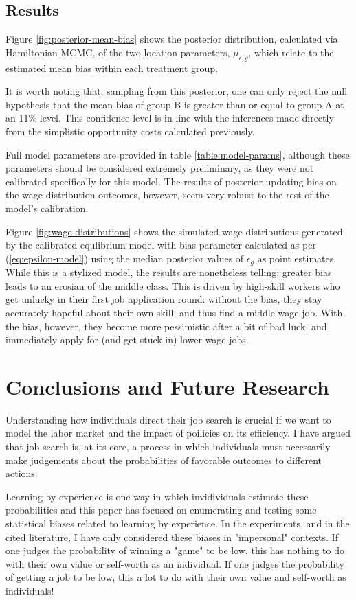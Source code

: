 \documentclass[a4paper,12pt]{article}
\begin{document}
\subsection{ Results }

Figure \ref{fig:posterior-mean-bias} shows the posterior distribution, calculated via Hamiltonian MCMC, of the two location parameters, $\mu_{\epsilon, g}$, which relate to the estimated mean bias within each treatment group.

It is worth noting that, sampling from this posterior, one can only reject the null hypothesis that the mean bias of group B is greater than or equal to group A at an 11\% level. This confidence level is in line with the inferences made directly from the simplistic opportunity costs calculated previously.

Full model parameters are provided in table \ref{table:model-params}, although these parameters should be considered extremely preliminary, as they were not calibrated specifically for this model. The results of posterior-updating bias on the wage-distribution outcomes, however, seem very robust to the rest of the model's calibration.

Figure \ref{fig:wage-distributions} shows the simulated wage distributions generated by the calibrated equlibrium model with bias parameter calculated as per (\ref{eq:epsilon-model}) using the median posterior values of $\epsilon_g$ as point estimates. While this is a stylized model, the results are nonetheless telling: greater bias leads to an erosian of the middle class. This is driven by high-skill workers who get unlucky in their first job application round: without the bias, they stay accurately hopeful about their own skill, and thus find a middle-wage job. With the bias, however, they become more pessimistic after a bit of bad luck, and immediately apply for (and get stuck in) lower-wage jobs.

\section{ Conclusions and Future Research }

Understanding how individuals direct their job search is crucial if we want to model the labor market and the impact of poilicies on its efficiency. I have argued that job search is, at its core, a process in which individuals must necessarily make judgements about the probabilities of favorable outcomes to different actions.

Learning by experience is one way in which invidividuals estimate these probabilities and this paper has focused on enumerating and testing some statistical biases related to learning by experience. In the experiments, and in the cited literature, I have only considered these biases in "impersonal" contexts. If one judges the probability of winning a "game" to be low, this has nothing to do with their own value or self-worth as an individual. If one judges the probability of getting a job to be low, this a lot to do with their own value and self-worth as individuals!
\end{document}
